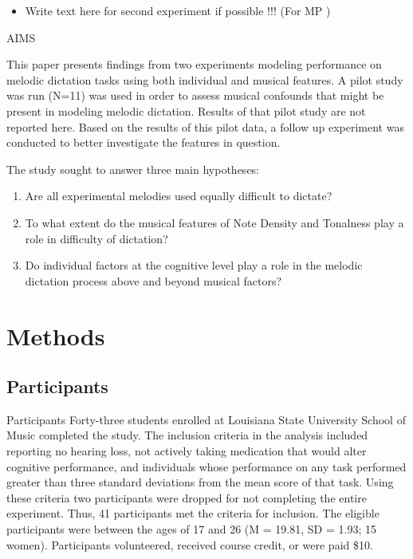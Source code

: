\documentclass[]{book}
\providecommand{\tightlist}{%
  \setlength{\itemsep}{0pt}\setlength{\parskip}{0pt}}
\begin{document}
\begin{itemize}
\tightlist
\item
  Write text here for second experiment if possible !!! (For MP )
\end{itemize}

AIMS

This paper presents findings from two experiments modeling performance on melodic dictation tasks using both individual
and musical features.
A pilot study was run (N=11) was used in order to assess musical confounds that might be present in modeling melodic dictation. Results of that pilot study are not reported here.
Based on the results of this pilot data, a follow up experiment was conducted to better investigate the features in question.

The study sought to answer three main hypotheses:

\begin{enumerate}
\def\labelenumi{\arabic{enumi}.}
\tightlist
\item
  Are all experimental melodies used equally difficult to
  dictate?
\item
  To what extent do the musical features of Note Density
  and Tonalness play a role in difficulty of dictation?
\item
  Do individual factors at the cognitive level play a role
  in the melodic dictation process above and beyond musical
  factors?
\end{enumerate}

\hypertarget{methods-1}{%
\section{Methods}\label{methods-1}}

\hypertarget{participants-1}{%
\subsection{Participants}\label{participants-1}}

Participants Forty-three students enrolled at Louisiana State
University School of Music completed the study.
The inclusion criteria in the analysis included reporting no hearing loss, not actively taking medication that would alter cognitive performance, and individuals whose performance on any task performed greater than three standard deviations from the mean score of that task.
Using these criteria two participants were dropped for not completing the entire experiment.
Thus, 41 participants met the criteria for inclusion.
The eligible participants were between the ages of 17 and 26 (M = 19.81, SD = 1.93; 15 women).
Participants volunteered, received course credit, or were paid \$10.
\end{document}
